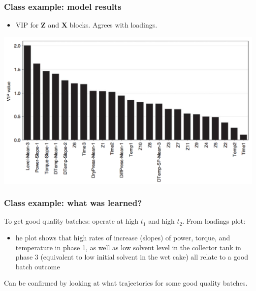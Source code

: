 \begin{frame}\frametitle{Class example: model results}
	
	\begin{itemize}
		\item	VIP for \( \mathbf{Z} \) and \( \mathbf{X} \) blocks. Agrees with loadings.
	\end{itemize}
	
	\begin{center}
		\includegraphics[width=\textwidth]{images/fmc/fmc-VIP-values-features.png}
	\end{center}
\end{frame}

\begin{frame}\frametitle{Class example: what was learned?}
	
	To get good quality batches: operate at high \( t_1 \) and high \( t_2 \).  From loadings plot:
	
	\begin{itemize}
		\item	he plot shows that high rates of increase (slopes) of power, torque, and temperature in phase 1, as well as low solvent level in the collector tank in phase 3 (equivalent to low initial solvent in the wet cake) all relate to a good batch outcome
	\end{itemize}
	
	Can be confirmed by looking at what trajectories for some good quality batches.
	
	
\end{frame}

